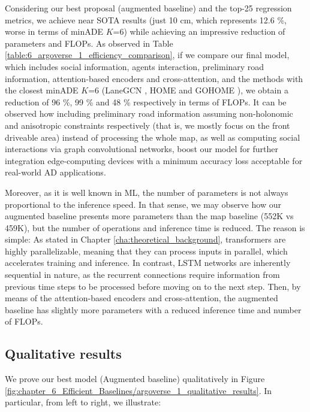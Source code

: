 Considering our best proposal (augmented baseline) and the top-25 regression metrics, we achieve near \ac{SOTA} results (just 10 cm, which represents 12.6 \%, worse in terms of \ac{minADE} $K$=6) while achieving an impressive reduction of parameters and \acp{FLOP}. As observed in Table \ref{table:6_argoverse_1_efficiency_comparison}, if we compare our final model, which includes social information, agents interaction, preliminary road information, attention-based encoders and cross-attention, and the methods with the closest \ac{minADE} $K$=6 (LaneGCN \cite{liang2020learning}, HOME \cite{gilles2021home} and GOHOME \cite{gilles2022gohome}), we obtain a reduction of 96 \%, 99 \% and 48 \% respectively in terms of \acp{FLOP}. It can be observed how including preliminary road information assuming non-holonomic \cite{triggs1993motion} and anisotropic \cite{ross1989planning} constraints respectively (that is, we mostly focus on the front driveable area) instead of processing the whole map, as well as computing social interactions via graph convolutional networks, boost our model for further integration edge-computing devices with a minimum accuracy loss acceptable for real-world \ac{AD} applications. 

Moreover, as it is well known in \ac{ML}, the number of parameters is not always proportional to the inference speed. In that sense, we may observe how our augmented baseline presents more parameters than the map baseline (552K vs 459K), but the number of operations and inference time is reduced. The reason is simple: As stated in Chapter \ref{cha:theoretical_background}, transformers are highly parallelizable, meaning that they can process inputs in parallel, which accelerates training and inference. In contrast, \ac{LSTM} networks are inherently sequential in nature, as the recurrent connections require information from previous time steps to be processed before moving on to the next step. Then, by means of the attention-based encoders and cross-attention, the augmented baseline has slightly more parameters with a reduced inference time and number of \acp{FLOP}.

\subsection{Qualitative results}
\label{subsec:6_efficient_baselines_qualitative_results}

We prove our best model (Augmented baseline) qualitatively in Figure \ref{fig:chapter_6_Efficient_Baselines/argoverse_1_qualitative_results}. In particular, from left to right, we illustrate:

